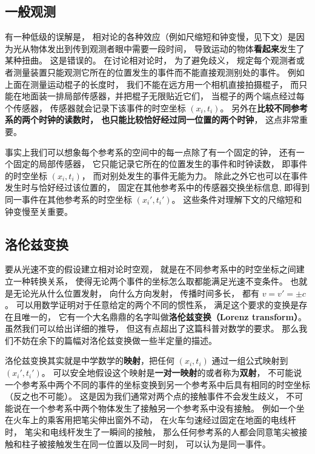 \subsection{一般观测}\label{sub_Relat0_2}
有一种低级的误解是， 相对论的各种效应（例如尺缩短和钟变慢，见下文）是因为光从物体发出到传到观测者眼中需要一段时间， 导致运动的物体\textbf{看起来}发生了某种扭曲。 这是错误的。 在讨论相对论时， 为了避免歧义， 规定每个观测者或者测量装置只能观测它所在的位置发生的事件而不能直接观测别处的事件。 例如上面在测量运动棍子的长度时， 我们不能在远方用一个相机直接拍摄棍子， 而只能在地面装一排局部传感器，并把棍子无限贴近它们， 当棍子的两个端点经过每个传感器， 传感器就会记录下该事件的时空坐标 $(x_i, t_i)$。 另外在\textbf{比较不同参考系的两个时钟的读数时， 也只能比较恰好经过同一位置的两个时钟}， 这点非常重要。

事实上我们可以想象每个参考系的空间中的每一点除了有一个固定的钟， 还有一个固定的局部传感器， 它只能记录它所在的位置发生的事件和时钟读数， 即事件的时空坐标 $(x_i, t_i)$， 而对别处发生的事件无能为力。 除此之外它也可以在事件发生时与恰好经过该位置的， 固定在其他参考系中的传感器交换坐标信息, 即得到同一事件在其他参考系的时空坐标 $(x_i', t_i')$。 这些条件对理解下文的尺缩短和钟变慢至关重要。

\subsection{洛伦兹变换}
要从光速不变的假设建立相对论时空观， 就是在不同参考系中的时空坐标之间建立一种转换关系， 使得无论两个事件的坐标怎么取都能满足光速不变条件。 也就是无论光从什么位置发射， 向什么方向发射， 传播时间多长， 都有 $v = v' = \pm c$。 可以用数学证明对于任意给定的两个不同的惯性系， 满足这个要求的变换是存在且唯一的， 它有一个大名鼎鼎的名字叫做\textbf{洛伦兹变换（Lorenz transform）}。 虽然我们可以给出详细的推导， 但这有点超出了这篇科普对数学的要求。 那么我们不妨在余下的篇幅对洛伦兹变换做一些半定量的描述。

洛伦兹变换其实就是中学数学的\textbf{映射}，把任何 $(x_i, t_i)$ 通过一组公式映射到 $(x_i', t_i')$。 可以安全地假设这个映射是\textbf{一对一映射}的或者称为\textbf{双射}， 不可能说一个参考系中两个不同的事件的坐标变换到另一个参考系中后具有相同的时空坐标（反之也不可能）。 这是因为我们通常对两个点的接触事件不会发生歧义， 不可能说在一个参考系中两个物体发生了接触另一个参考系中没有接触。 例如一个坐在火车上的乘客用把笔尖伸出窗外不动， 在火车匀速经过固定在地面的电线杆时， 笔尖和电线杆发生了一瞬间的接触， 那么任何参考系的人都会同意笔尖被接触和柱子被接触发生在同一位置以及同一时刻， 可以认为是同一事件。

